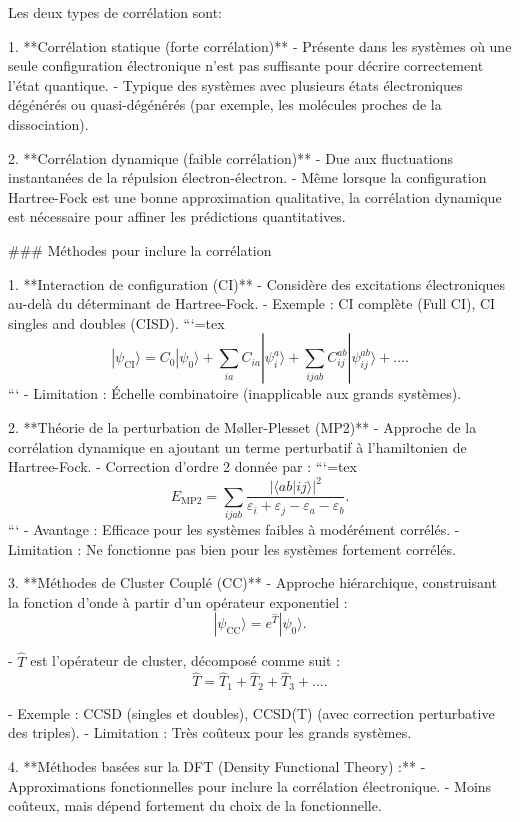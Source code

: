 \documentclass[12pt,a4paper]{report}
\begin{document}
\begin{markdown}
 Les deux types de corrélation sont:

1. **Corrélation statique (forte corrélation)**
   - Présente dans les systèmes où une seule configuration électronique n’est pas suffisante pour décrire correctement l’état quantique.
   - Typique des systèmes avec plusieurs états électroniques dégénérés ou quasi-dégénérés (par exemple, les molécules proches de la dissociation).

2. **Corrélation dynamique (faible corrélation)**
   - Due aux fluctuations instantanées de la répulsion électron-électron.
   - Même lorsque la configuration Hartree-Fock est une bonne approximation qualitative, la corrélation dynamique est nécessaire pour affiner les prédictions quantitatives.

### Méthodes pour inclure la corrélation

1. **Interaction de configuration (CI)**
   - Considère des excitations électroniques au-delà du déterminant de Hartree-Fock.
   - Exemple : CI complète (Full CI), CI singles and doubles (CISD).
```{=tex}
\[
|\psi_{\text{CI}}\rangle = C_0 |\psi_0\rangle + \sum_{ia} C_{ia} |\psi_i^a\rangle + \sum_{ijab} C_{ij}^{ab} |\psi_{ij}^{ab}\rangle + \dots .
\]
```
   - Limitation : Échelle combinatoire (inapplicable aux grands systèmes).

2. **Théorie de la perturbation de Møller-Plesset (MP2)**
   - Approche de la corrélation dynamique en ajoutant un terme perturbatif à l'hamiltonien de Hartree-Fock.
   - Correction d'ordre 2 donnée par :
```{=tex}
\[
E_{\text{MP2}} = \sum_{ijab} \frac{|\langle ab | ij \rangle|^2}{\varepsilon_i + \varepsilon_j - \varepsilon_a - \varepsilon_b} .
\]
```
   - Avantage : Efficace pour les systèmes faibles à modérément corrélés.
   - Limitation : Ne fonctionne pas bien pour les systèmes fortement corrélés.

3. **Méthodes de Cluster Couplé (CC)**
   - Approche hiérarchique, construisant la fonction d’onde à partir d’un opérateur exponentiel :
\[
|\psi_{\text{CC}}\rangle = e^{\hat{T}} |\psi_0\rangle .
\]

   - \(\hat{T}\) est l’opérateur de cluster, décomposé comme suit :
\[
\hat{T} = \hat{T}_1 + \hat{T}_2 + \hat{T}_3 + \dots .
\]

   - Exemple : CCSD (singles et doubles), CCSD(T) (avec correction perturbative des triples).
   - Limitation : Très coûteux pour les grands systèmes.

4. **Méthodes basées sur la DFT (Density Functional Theory) :**
   - Approximations fonctionnelles pour inclure la corrélation électronique.
   - Moins coûteux, mais dépend fortement du choix de la fonctionnelle.


\end{markdown}
\end{document}
